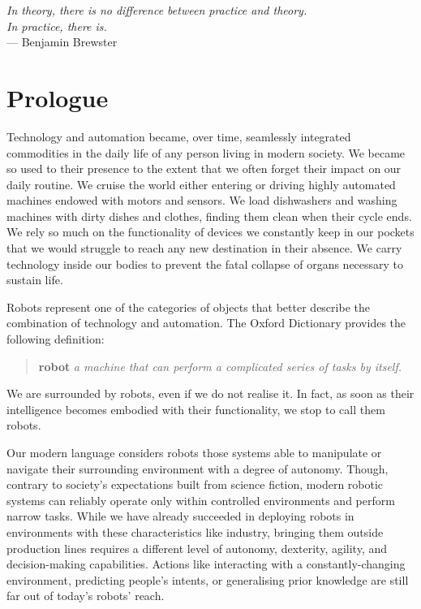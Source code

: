 \cleardoublepage
{}
{}

\begin{flushright}
    \textsl{\onehalfspacing
    In theory, there is no difference between practice and theory.\\
    In practice, there is.}\\
    --- Benjamin Brewster
\end{flushright}

\let\cleardoublepage\relax

\chapter*{Prologue}

Technology and automation became, over time, seamlessly integrated commodities in the daily life of any person living in modern society.
We became so used to their presence to the extent that we often forget their impact on our daily routine.
We cruise the world either entering or driving highly automated machines endowed with motors and sensors.
We load dishwashers and washing machines with dirty dishes and clothes, finding them clean when their cycle ends.
We rely so much on the functionality of devices we constantly keep in our pockets that we would struggle to reach any new destination in their absence.
We carry technology inside our bodies to prevent the fatal collapse of organs necessary to sustain life.

Robots represent one of the categories of objects that better describe the combination of technology and automation.
The Oxford Dictionary provides the following definition:
%
\begin{quote}
    \hspace{-8.5mm}
    \textbf{robot} \textit{a machine that can perform a complicated series of tasks by itself.}
\end{quote}
%
We are surrounded by robots, even if we do not realise it.
In fact, as soon as their intelligence becomes embodied with their functionality, we stop to call them robots.

Our modern language considers robots those systems able to manipulate or navigate their surrounding environment with a degree of autonomy.
Though, contrary to society's expectations built from science fiction, modern robotic systems can reliably operate only within controlled environments and perform narrow tasks.
While we have already succeeded in deploying robots in environments with these characteristics like industry, bringing them outside production lines requires a different level of autonomy, dexterity, agility, and decision-making capabilities.
Actions like interacting with a constantly-changing environment, predicting people's intents, or generalising prior knowledge are still far out of today’s robots' reach.

